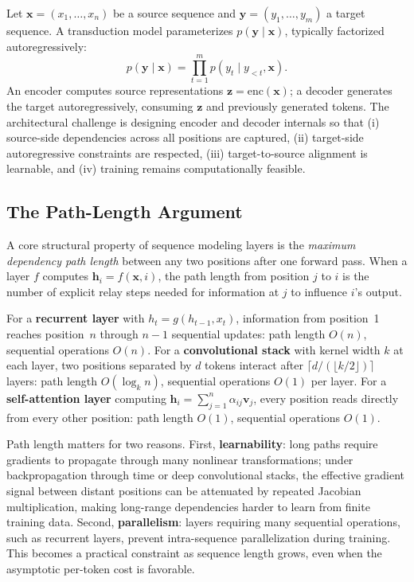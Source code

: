 ﻿\documentclass{article}
\begin{document}
Let $\mathbf{x} = (x_1, \ldots, x_n)$ be a source sequence and $\mathbf{y} = (y_1, \ldots, y_m)$ a target sequence. A transduction model parameterizes $p(\mathbf{y} \mid \mathbf{x})$, typically factorized autoregressively:
\begin{equation}
p(\mathbf{y} \mid \mathbf{x}) = \prod_{t=1}^{m} p(y_t \mid y_{<t}, \mathbf{x}).
\end{equation}
An encoder computes source representations $\mathbf{z} = \text{enc}(\mathbf{x})$; a decoder generates the target autoregressively, consuming $\mathbf{z}$ and previously generated tokens. The architectural challenge is designing encoder and decoder internals so that (i) source-side dependencies across all positions are captured, (ii) target-side autoregressive constraints are respected, (iii) target-to-source alignment is learnable, and (iv) training remains computationally feasible.

\subsection{The Path-Length Argument}

A core structural property of sequence modeling layers is the \emph{maximum dependency path length} between any two positions after one forward pass. When a layer $f$ computes $\mathbf{h}_i = f(\mathbf{x}, i)$, the path length from position $j$ to $i$ is the number of explicit relay steps needed for information at $j$ to influence $i$'s output.

For a \textbf{recurrent layer} with $h_t = g(h_{t-1}, x_t)$, information from position~1 reaches position~$n$ through $n-1$ sequential updates: path length $O(n)$, sequential operations $O(n)$. For a \textbf{convolutional stack} with kernel width $k$ at each layer, two positions separated by $d$ tokens interact after $\lceil d/(\lfloor k/2\rfloor) \rceil$ layers: path length $O(\log_k n)$, sequential operations $O(1)$ per layer. For a \textbf{self-attention layer} computing $\mathbf{h}_i = \sum_{j=1}^{n} \alpha_{ij} \mathbf{v}_j$, every position reads directly from every other position: path length $O(1)$, sequential operations $O(1)$.

Path length matters for two reasons. First, \textbf{learnability}: long paths require gradients to propagate through many nonlinear transformations; under backpropagation through time or deep convolutional stacks, the effective gradient signal between distant positions can be attenuated by repeated Jacobian multiplication, making long-range dependencies harder to learn from finite training data. Second, \textbf{parallelism}: layers requiring many sequential operations, such as recurrent layers, prevent intra-sequence parallelization during training. This becomes a practical constraint as sequence length grows, even when the asymptotic per-token cost is favorable.
\end{document}
